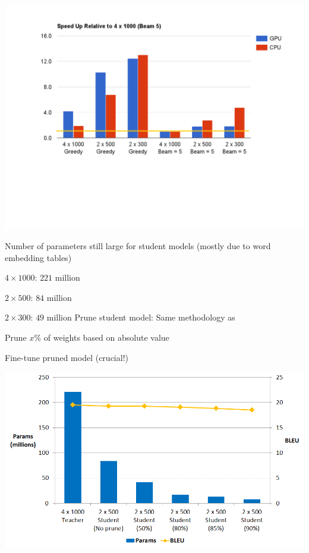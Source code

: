 \documentclass{beamer}
\let\tempone\itemize
\let\temptwo\enditemize
\renewenvironment{itemize}{\tempone\addtolength{\itemsep}{0.5\baselineskip}}{\temptwo}
\newcommand{\air}{\vspace{0.25cm}}
\begin{document}
\begin{frame}
\centerline{}
\center
\vspace{-5mm}
\includegraphics[scale=0.44]{dec-speed.pdf}
\end{frame}


\begin{frame}
\centerline{}
\air
\air
Number of parameters still large for student models (mostly due to word embedding tables)
\begin{itemize}
\item $4 \times 1000$: $221$ million
\item $2 \times 500$: $84$ million
\item $2 \times 300$: $49$ million
\end{itemize}
 \air
\pause
Prune student model: Same methodology as \cite{See2016}
\begin{itemize}
\item Prune $x\%$ of weights based on absolute value
\item Fine-tune pruned model (crucial!)
\end{itemize}
\end{frame}

\begin{frame}
\centerline{}
\air
\air
\includegraphics[scale=0.4]{size}
\end{frame}
\end{document}
